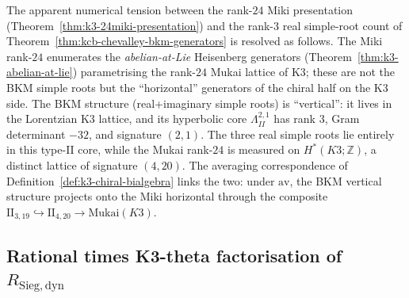 \begin{remark}
\label{rem:kcb-rank-counting}
The apparent numerical tension between the rank-$24$ Miki presentation
(Theorem~\ref{thm:k3-24miki-presentation}) and the rank-$3$ real
simple-root count of Theorem~\ref{thm:kcb-chevalley-bkm-generators}
is resolved as follows. The Miki rank-$24$ enumerates the
\emph{abelian-at-Lie} Heisenberg generators
(Theorem~\ref{thm:k3-abelian-at-lie}) parametrising the rank-$24$ Mukai
lattice of K3; these are not the BKM simple roots but the ``horizontal''
generators of the chiral half on the K3 side. The BKM structure
(real+imaginary simple roots) is ``vertical'': it lives in the
Lorentzian K3 lattice, and its hyperbolic core
$\Lambda^{2,1}_{II}$ has rank $3$, Gram determinant $-32$, and
signature $(2,1)$. The three real simple roots lie entirely in this
type-II core, while the Mukai rank-$24$ is measured on
$H^\ast(K3;\mathbb{Z})$, a distinct lattice of signature $(4,20)$. The
averaging correspondence of
Definition~\ref{def:k3-chiral-bialgebra} links the two: under
$\mathrm{av}$, the BKM vertical structure projects onto the Miki
horizontal through the composite
$\mathrm{II}_{3,19}\hookrightarrow\mathrm{II}_{4,20}\to\mathrm{Mukai}(K3)$.
\end{remark}

\subsection{Rational times K3-theta factorisation of \texorpdfstring{$R_{\mathrm{Sieg,dyn}}$}{R-Sieg,dyn}}
\label{subsec:kcb-r-factorisation}

